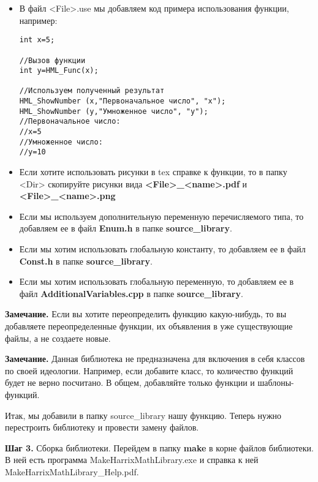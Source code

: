 \begin{itemize}
\begin{lstlisting}[label=examplefiletex, caption=Содержимое HML\_Func.tex]
 x --- входной параметр.

\textbf{Возвращаемое значение:}
Число умноженное на 2.
\end{lstlisting}

\item В файл <File>.use мы добавляем код примера использования функции, например:
\begin{lstlisting}[label=examplefileuse, caption=Содержимое HML\_Func.use]
int x=5;

//Вызов функции
int y=HML_Func(x);

//Используем полученный результат
HML_ShowNumber (x,"Первоначальное число", "x");
HML_ShowNumber (y,"Умноженное число", "y");
//Первоначальное число:
//x=5
//Умноженное число:
//y=10
\end{lstlisting}

\item Если хотите использовать рисунки в tex справке к функции, то в папку <Dir> скопируйте рисунки вида  \textbf{<File>\_<name>.pdf} и \textbf{<File>\_<name>.png}

\item Если мы используем дополнительную переменную перечисляемого типа, то добавляем ее в файл \textbf{Enum.h} в папке \textbf{source\_library}.

\item Если мы хотим использовать глобальную константу, то добавляем ее в файл \textbf{Const.h} в папке \textbf{source\_library}.

\item Если мы хотим использовать глобальную переменную, то добавляем ее в файл \textbf{AdditionalVariables.cpp} в папке \textbf{source\_library}.

\end{itemize}

\textbf{Замечание.} Если вы хотите переопределить функцию какую-нибудь, то вы добавляете переопределенные функции, их объявления в уже существующие файлы, а не создаете новые.

\textbf{Замечание.} Данная библиотека не предназначена для включения в себя классов по своей идеологии. Например, если добавите класс, то количество функций будет не верно посчитано. В общем, добавляйте только функции и шаблоны-функций.

Итак, мы добавили в папку source\_library нашу функцию. Теперь нужно перестроить библиотеку и провести замену файлов.

\textbf{Шаг 3.}\label{step3} Сборка библиотеки. Перейдем в папку \textbf{make} в корне файлов библиотеки. В ней есть программа MakeHarrixMathLibrary.exe и справка к ней MakeHarrixMathLibrary\_Help.pdf. 

